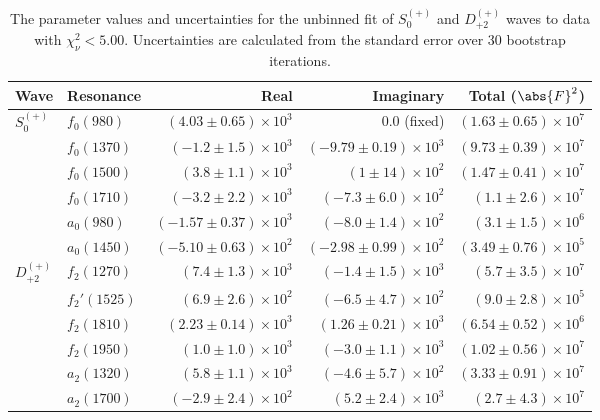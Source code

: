 \begin{table}[ht]
    \begin{center}
        \begin{tabular}{llrrr}\toprule
        Wave & Resonance & Real & Imaginary & Total ($\abs{F}^2$) \\\midrule
$S_{0}^{(+)}$ & $f_{0}(980)$ & $(4.03 \pm 0.65) \times 10^{3}$ & $0.0$ (fixed) & $(1.63 \pm 0.65) \times 10^{7}$ \\
 & $f_{0}(1370)$ & $(-1.2 \pm 1.5) \times 10^{3}$ & $(-9.79 \pm 0.19) \times 10^{3}$ & $(9.73 \pm 0.39) \times 10^{7}$ \\
 & $f_{0}(1500)$ & $(3.8 \pm 1.1) \times 10^{3}$ & $(1 \pm 14) \times 10^{2}$ & $(1.47 \pm 0.41) \times 10^{7}$ \\
 & $f_{0}(1710)$ & $(-3.2 \pm 2.2) \times 10^{3}$ & $(-7.3 \pm 6.0) \times 10^{2}$ & $(1.1 \pm 2.6) \times 10^{7}$ \\
 & $a_{0}(980)$ & $(-1.57 \pm 0.37) \times 10^{3}$ & $(-8.0 \pm 1.4) \times 10^{2}$ & $(3.1 \pm 1.5) \times 10^{6}$ \\
 & $a_{0}(1450)$ & $(-5.10 \pm 0.63) \times 10^{2}$ & $(-2.98 \pm 0.99) \times 10^{2}$ & $(3.49 \pm 0.76) \times 10^{5}$ \\
$D_{+2}^{(+)}$ & $f_{2}(1270)$ & $(7.4 \pm 1.3) \times 10^{3}$ & $(-1.4 \pm 1.5) \times 10^{3}$ & $(5.7 \pm 3.5) \times 10^{7}$ \\
 & $f_{2}'(1525)$ & $(6.9 \pm 2.6) \times 10^{2}$ & $(-6.5 \pm 4.7) \times 10^{2}$ & $(9.0 \pm 2.8) \times 10^{5}$ \\
 & $f_{2}(1810)$ & $(2.23 \pm 0.14) \times 10^{3}$ & $(1.26 \pm 0.21) \times 10^{3}$ & $(6.54 \pm 0.52) \times 10^{6}$ \\
 & $f_{2}(1950)$ & $(1.0 \pm 1.0) \times 10^{3}$ & $(-3.0 \pm 1.1) \times 10^{3}$ & $(1.02 \pm 0.56) \times 10^{7}$ \\
 & $a_{2}(1320)$ & $(5.8 \pm 1.1) \times 10^{3}$ & $(-4.6 \pm 5.7) \times 10^{2}$ & $(3.33 \pm 0.91) \times 10^{7}$ \\
 & $a_{2}(1700)$ & $(-2.9 \pm 2.4) \times 10^{2}$ & $(5.2 \pm 2.4) \times 10^{3}$ & $(2.7 \pm 4.3) \times 10^{7}$ \\\bottomrule
        \end{tabular}
    \caption{The parameter values and uncertainties for the unbinned fit of $S_{0}^{(+)}$ and $D_{+2}^{(+)}$ waves to data with $\chi^2_\nu < 5.00$. Uncertainties are calculated from the standard error over $30$ bootstrap iterations.}\label{tab:unbinned-fit-chisqdof-5.0-Sp0p-Dp2p}
    \end{center}
\end{table}
